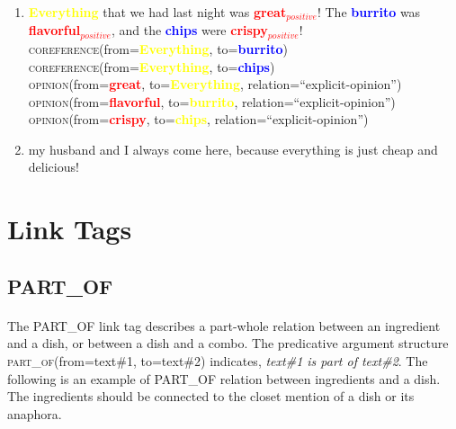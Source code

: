 \documentclass{article}
\begin{document}
\begin{enumerate}[resume]
\item \textbf{\textcolor{yellow}{Everything}} that we had last night was \textbf{\textcolor{red}{great$_{positive}$}}! The \textbf{\textcolor{blue}{burrito}} was \textbf{\textcolor{red}{flavorful$_{positive}$}}, and the \textbf{\textcolor{blue}{chips}} were \textbf{\textcolor{red}{crispy$_{positive}$}}!\\
\textsc{coreference}(from=\textbf{\textcolor{yellow}{Everything}}, to=\textbf{\textcolor{blue}{burrito}})\\
\textsc{coreference}(from=\textbf{\textcolor{yellow}{Everything}}, to=\textbf{\textcolor{blue}{chips}})\\
\textsc{opinion}(from=\textbf{\textcolor{red}{great}}, to=\textbf{\textcolor{yellow}{Everything}}, relation=``explicit-opinion'')\\
\textsc{opinion}(from=\textbf{\textcolor{red}{flavorful}}, to=\textbf{\textcolor{yellow}{burrito}}, relation=``explicit-opinion'')\\
\textsc{opinion}(from=\textbf{\textcolor{red}{crispy}}, to=\textbf{\textcolor{yellow}{chips}}, relation=``explicit-opinion'')
\item my husband and I always come here, because everything is just cheap and delicious!
\end{enumerate}

\newpage
\section{Link Tags}



\subsection{PART\_OF}
\paragraph{}
The PART\_OF link tag describes a part-whole relation between an ingredient and a dish, or between a dish and a combo. The predicative argument structure \textsc{part\_of}(from=text\#1, to=text\#2) indicates, \textit{text\#1 is part of text\#2}. The following is an example of PART\_OF relation between ingredients and a dish. The ingredients should be connected to the closet mention of a dish or its anaphora. 
\end{document}
